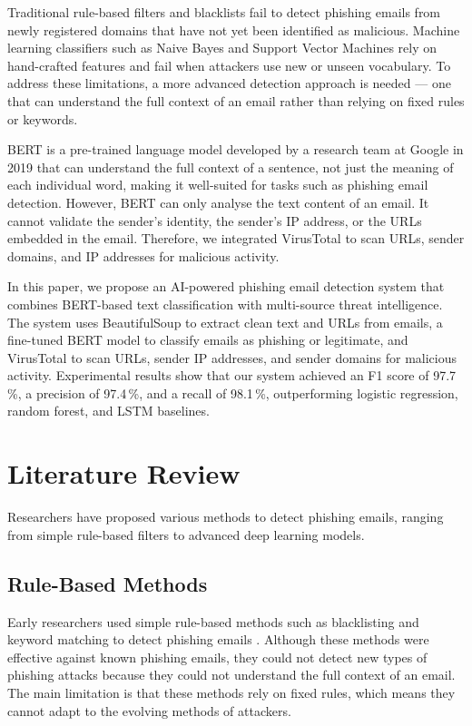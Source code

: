 \documentclass[conference]{IEEEtran}
\begin{document}
Traditional rule-based filters and blacklists fail to detect
phishing emails from newly registered domains that have not yet
been identified as malicious. Machine learning classifiers such as
Naive Bayes and Support Vector Machines rely on hand-crafted
features and fail when attackers use new or unseen vocabulary. To
address these limitations, a more advanced detection approach is
needed --- one that can understand the full context of an email
rather than relying on fixed rules or keywords.

BERT is a pre-trained language model developed by a research team
at Google in 2019 \cite{devlin2019bert} that can understand the
full context of a sentence, not just the meaning of each individual
word, making it well-suited for tasks such as phishing email
detection. However, BERT can only analyse the text content of an
email. It cannot validate the sender's identity, the sender's IP
address, or the URLs embedded in the email. Therefore, we
integrated VirusTotal to scan URLs, sender domains, and IP
addresses for malicious activity.

In this paper, we propose an AI-powered phishing email detection
system that combines BERT-based text classification with
multi-source threat intelligence. The system uses BeautifulSoup to
extract clean text and URLs from emails, a fine-tuned BERT model
to classify emails as phishing or legitimate, and VirusTotal to
scan URLs, sender IP addresses, and sender domains for malicious
activity. Experimental results show that our system achieved an F1
score of 97.7\,\%, a precision of 97.4\,\%, and a recall of
98.1\,\%, outperforming logistic regression, random forest, and
LSTM baselines.

\section{Literature Review}
\label{sec:review}

Researchers have proposed various methods to detect phishing
emails, ranging from simple rule-based filters to advanced deep
learning models.

\subsection{Rule-Based Methods}

Early researchers used simple rule-based methods such as
blacklisting and keyword matching to detect phishing emails
\cite{zhang2007cantina}. Although these methods were effective
against known phishing emails, they could not detect new types of
phishing attacks because they could not understand the full context
of an email. The main limitation is that these methods rely on
fixed rules, which means they cannot adapt to the evolving methods
of attackers.
\end{document}
